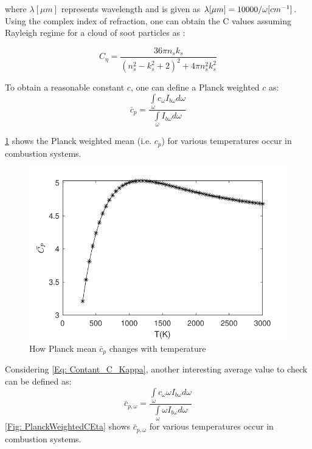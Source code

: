 \documentclass[3p]{elsarticle}
\begin{document}
where \({\lambda [\mu m]}\) represents wavelength and is given as \(\lambda [\mu m] = {{10000} \mathord{\left/
		{\vphantom {{10000} \omega }} \right.
		\kern-\nulldelimiterspace} \omega }[c{m^{ - 1}}]\).
Using the complex index of refraction, one can obtain the C values assuming Rayleigh regime for a cloud of soot particles as \cite{modest2013radiative,ChangeCharalampopoulos1990}:

\begin{equation}
C_\eta=\frac{36\pi n_s k_s}{(n_s^2-k_s^2+2)^2+4\pi n_s^2 k_s^2}
\label{Eq:C_Omega}
\end{equation}

To obtain a reasonable constant  \(c\), one can define a Planck weighted \(c\) as:
\begin{equation}
{\bar c_p} = \frac{{\int\limits_\omega  {{c_\omega }{I_{b\omega }}d\omega } }}{{\int\limits_\omega  {{I_{b\omega }}d\omega } }}
\end{equation}

\cref{Fig: PlanckWeightedC} shows the Planck weighted mean (i.e. \(c_p\)) for various temperatures occur in combustion systems.

\begin{figure}[h!]
			\centering\includegraphics[width=12cm]{Figures/Fig1_P_C.pdf}
			\caption{How  Planck  mean  \({\bar c_p}\)  changes  with  temperature}
			\label{Fig: PlanckWeightedC}
\end{figure}
Considering \cref{Eq: Contant_C_Kappa}, another interesting average value to check can be defined as:
\begin{equation}
{\bar c_{p,\omega }} = \frac{{\int\limits_\omega  {{c_\omega }\omega {I_{b\omega }}d\omega } }}{{\int\limits_\omega  {\omega {I_{b\omega }}d\omega } }}
\end{equation}
\cref{Fig: PlanckWeightedCEta} shows \(\bar c_{p,\omega }\) for various temperatures occur in combustion systems.
  
\end{document}
